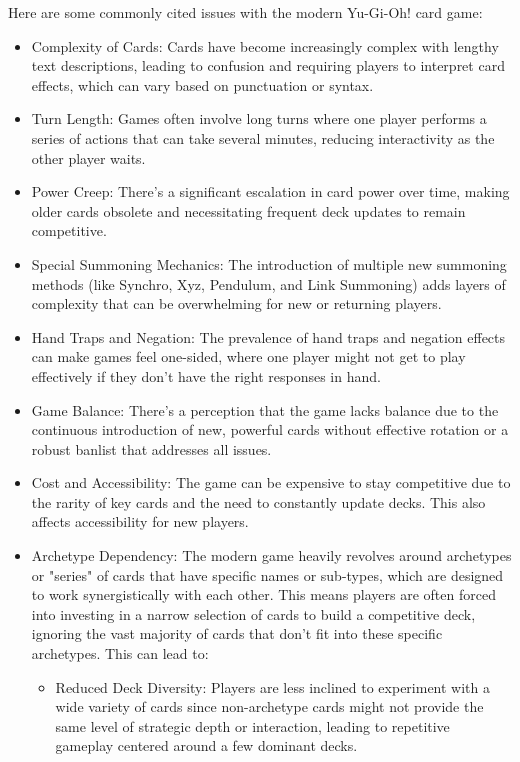 Here are some commonly cited issues with the modern Yu-Gi-Oh! card game:
\begin{itemize}
	\item Complexity of Cards: Cards have become increasingly complex with lengthy text descriptions, leading to confusion and requiring players to interpret card effects, which can vary based on punctuation or syntax.
	\item Turn Length: Games often involve long turns where one player performs a series of actions that can take several minutes, reducing interactivity as the other player waits.
	\item Power Creep: There's a significant escalation in card power over time, making older cards obsolete and necessitating frequent deck updates to remain competitive.
	\item Special Summoning Mechanics: The introduction of multiple new summoning methods (like Synchro, Xyz, Pendulum, and Link Summoning) adds layers of complexity that can be overwhelming for new or returning players.
	\item Hand Traps and Negation: The prevalence of hand traps and negation effects can make games feel one-sided, where one player might not get to play effectively if they don't have the right responses in hand.
	\item Game Balance: There's a perception that the game lacks balance due to the continuous introduction of new, powerful cards without effective rotation or a robust banlist that addresses all issues.
	\item Cost and Accessibility: The game can be expensive to stay competitive due to the rarity of key cards and the need to constantly update decks. This also affects accessibility for new players. 
	\item Archetype Dependency: The modern game heavily revolves around archetypes or "series" of cards that have specific names or sub-types, which are designed to work synergistically with each other. This means players are often forced into investing in a narrow selection of cards to build a competitive deck, ignoring the vast majority of cards that don't fit into these specific archetypes. This can lead to:
		\begin{itemize}
			  \item Reduced Deck Diversity: Players are less inclined to experiment with a wide variety of cards since non-archetype cards might not provide the same level of strategic depth or interaction, leading to repetitive gameplay centered around a few dominant decks.

\end{itemize}
\end{itemize}
